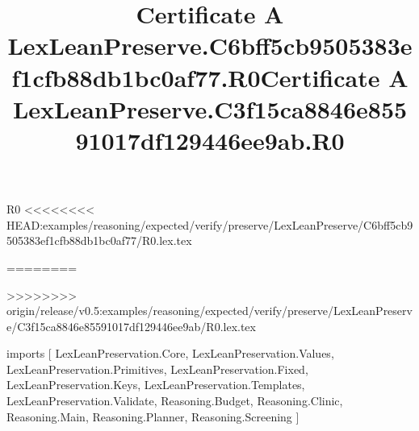 \begin{lexlean}{R0}
<<<<<<<< HEAD:examples/reasoning/expected/verify/preserve/LexLeanPreserve/C6bff5cb9505383ef1cfb88db1bc0af77/R0.lex.tex
\title{Certificate A LexLeanPreserve.C6bff5cb9505383ef1cfb88db1bc0af77.R0}
========
\title{Certificate A LexLeanPreserve.C3f15ca8846e85591017df129446ee9ab.R0}
>>>>>>>> origin/release/v0.5:examples/reasoning/expected/verify/preserve/LexLeanPreserve/C3f15ca8846e85591017df129446ee9ab/R0.lex.tex
\begin{coremodule}
imports [
  LexLeanPreservation.Core,
  LexLeanPreservation.Values,
  LexLeanPreservation.Primitives,
  LexLeanPreservation.Fixed,
  LexLeanPreservation.Keys,
  LexLeanPreservation.Templates,
  LexLeanPreservation.Validate,
  Reasoning.Budget,
  Reasoning.Clinic,
  Reasoning.Main,
  Reasoning.Planner,
  Reasoning.Screening
]


\end{coremodule}
\end{lexlean}
